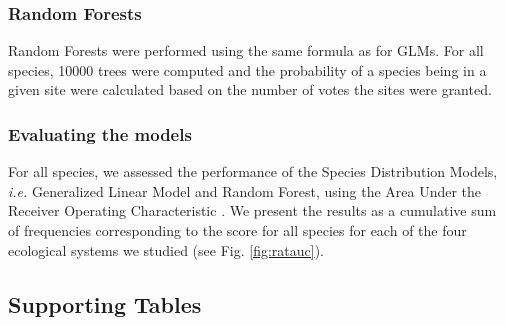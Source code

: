 \subsubsection{Random Forests}\label{random-forests}

Random Forests \citep{Prasad2006} were performed using the same formula
as for GLMs. For all species, 10000 trees were computed and the
probability of a species being in a given site were calculated based on
the number of votes the sites were granted.

\subsubsection{Evaluating the models}\label{evaluating-the-models}

For all species, we assessed the performance of the Species Distribution
Models, \emph{i.e.} Generalized Linear Model and Random Forest, using
the Area Under the Receiver Operating Characteristic
\citep[AUROC,][]{Elith2006}. We present the results as a cumulative sum
of frequencies corresponding to the score for all species for each of
the four ecological systems we studied (see Fig. \ref{fig:ratauc}).






\subsection{Supporting Tables}\label{supporting-tables}


